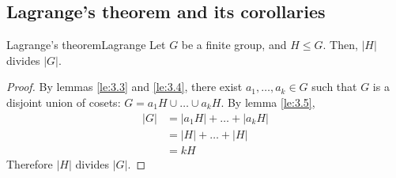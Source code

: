 \documentclass[12pt]{article}
\begin{document}
	\subsection{Lagrange's theorem and its corollaries}	
	\begin{mythm}{Lagrange's theorem}{Lagrange}
		Let $G$ be a finite group, and $H\leq G$. Then, $|H|$ divides $|G|$.
		\begin{proof}
			By lemmas \ref{le:3.3} and \ref{le:3.4}, there exist $a_1, \dots, a_k\in G$ such that $G$ is a disjoint union of cosets: $G=a_1H\cup\dots\cup a_kH$. By lemma \ref{le:3.5},
			\begin{align*}
				|G|&=|a_1H|+\dots+|a_kH|\\
				&=|H|+\dots+|H|\\
				&=kH
			\end{align*}
			Therefore $|H|$ divides $|G|$.
		\end{proof}
	\end{mythm}
	
\end{document}
